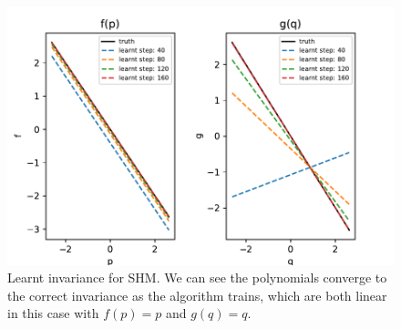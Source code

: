 \documentclass{statsmsc}
\begin{document}
\begin{figure}[H] 
  \includegraphics[width=0.8\linewidth]{../codes/figures/shm_learnt_over_time.pdf}
  \centering
  \caption{Learnt invariance for SHM. We can see the polynomials converge to the correct invariance as the algorithm trains, which are both linear in this case with $f(p)=p$ and $g(q)=q$.}
  \label{fig:shm_learnt}
\end{figure}
\end{document}
